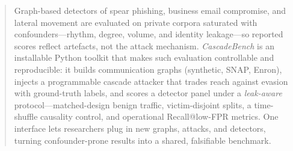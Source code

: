\begin{abstract}
\noindent
Graph-based detectors of spear phishing, business email compromise, and lateral movement are
evaluated on private corpora saturated with confounders---rhythm, degree, volume, and
identity leakage---so reported scores reflect artefacts, not the attack mechanism.
\emph{CascadeBench} is an installable Python toolkit that makes such evaluation controllable
and reproducible: it builds communication graphs (synthetic, SNAP, Enron), injects a
programmable cascade attacker that trades reach against evasion with ground-truth labels, and
scores a detector panel under a \emph{leak-aware} protocol---matched-design benign traffic,
victim-disjoint splits, a time-shuffle causality control, and operational Recall@low-FPR
metrics. One interface lets researchers plug in new graphs, attacks, and detectors, turning
confounder-prone results into a shared, falsifiable benchmark.
\end{abstract}